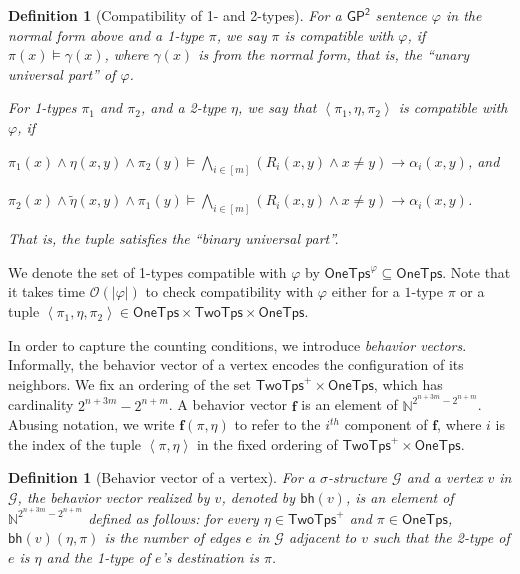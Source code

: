 \documentclass[10pt,a4paper]{article}
\newtheorem{definition}[theorem]{Definition}
\theoremstyle{definition}
\theoremstyle{remark}
\newcommand{\cG}{\mathcal{G}}
\newcommand{\cO}{\mathcal{O}}
\newcommand{\bbN}{\mathbb{N}}
\newcommand{\bff}{\mathbf{f}}
\newcommand{\vocab}{\sigma}
\newcommand{\twotypes}{\mathsf{TwoTps}}
\newcommand{\Onetypes}{\mathsf{OneTps}}
\newcommand{\GPtwo}   {\mathsf{GP^2}}
\newcommand{\tuple}[1]       {\left\langle #1 \right\rangle}
\newcommand{\intsinterval}[1]{{\left[ #1 \right]}}
\newcommand{\abs}[1]         {{\left| #1 \right|}}
\newcommand{\dual}[1] {\widetilde{ #1 }}
\newcommand{\bh}[1] {\mathsf{bh}\left( #1 \right)}
\newcommand{\bigO}[1] {{\cO\left( #1 \right)}}
\begin{document}
\begin{definition}[Compatibility of 1- and 2-types]
    For a $\GPtwo$ sentence $\varphi$ in the normal form above and a 1-type $\pi$,
    we say $\pi$ is \emph{compatible} with $\varphi$,
    if $\pi(x) \models \gamma(x)$, where $\gamma(x)$ is from the normal form,
    that is, the ``unary universal part'' of $\varphi$.

    For  1-types $\pi_1$ and $\pi_2$, and a 2-type $\eta$,
    we say that $\tuple{\pi_1, \eta, \pi_2}$ is \emph{compatible} with $\varphi$,
    if
    \begin{compactitem}
        \item $\pi_1(x) \land \eta(x, y) \land \pi_2(y) \models
        \bigwedge_{i \in \intsinterval{m}} \left(R_i(x,y) \land x \neq y\right) \to \alpha_i(x, y)$, and
        \item $\pi_2(x) \land \dual{\eta}(x, y) \land \pi_1(y) \models
        \bigwedge_{i \in \intsinterval{m}} \left(R_i(x,y) \land x \neq y\right) \to \alpha_i(x, y)$.
    \end{compactitem}
    That is, the tuple satisfies the ``binary universal part''.
\end{definition}
We denote the set of 1-types compatible with $\varphi$ by $\Onetypes^\varphi \subseteq \Onetypes$.
Note that it takes time $\bigO{\abs{\varphi}}$ to check compatibility with $\varphi$ either for a $1$-type $\pi$  or a tuple $\tuple{\pi_1, \eta, \pi_2} \in \Onetypes \times \twotypes \times \Onetypes$.

In order to capture the counting conditions, we introduce \emph{behavior vectors}.
Informally, the behavior vector of a vertex encodes the configuration of its neighbors.
We fix an ordering of the set $\twotypes^+ \times \Onetypes$,
which has cardinality $2^{n+3m}-2^{n+m}$.
A behavior vector $\bff$ is an element of $\bbN^{2^{n+3m}-2^{n+m}}$.
Abusing notation, we write $\bff(\pi, \eta)$
to refer to the $i^{th}$ component of $\bff$,
where $i$ is the index of the tuple $\tuple{\pi, \eta}$ in the fixed ordering of $\twotypes^+ \times \Onetypes$.

\begin{definition}[Behavior vector of a vertex]
    For a $\vocab$-structure $\cG$ and a vertex $v$ in $\cG$,
    the behavior vector realized by $v$,
    denoted by $\bh{v}$, is an element of $\bbN^{2^{n+3m}-2^{n+m}}$ defined as follows:
    for every $\eta \in \twotypes^+$ and $\pi \in \Onetypes$,
    $\bh{v}(\eta, \pi)$ is the number of edges $e$ in $\cG$ adjacent to $v$
    such that the 2-type of $e$ is $\eta$ and the 1-type of $e$'s destination is $\pi$.
\end{definition}
\end{document}
